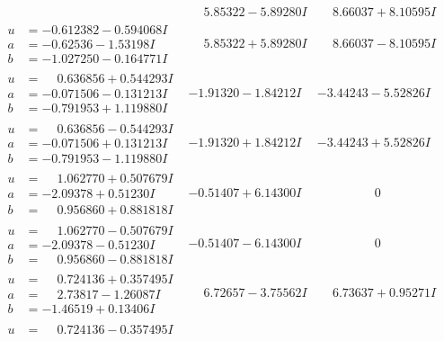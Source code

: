 \documentclass[1p]{elsarticle_modified}
\theoremstyle{definition}
\begin{document}
$$\begin{array}{c|c|c}
 & \phantom{-}5.85322 - 5.89280 I & \phantom{-}8.66037 + 8.10595 I \\ \hline\begin{aligned}
u &= -0.612382 - 0.594068 I \\
a &= -0.62536 - 1.53198 I \\
b &= -1.027250 - 0.164771 I\end{aligned}
 & \phantom{-}5.85322 + 5.89280 I & \phantom{-}8.66037 - 8.10595 I \\ \hline\begin{aligned}
u &= \phantom{-}0.636856 + 0.544293 I \\
a &= -0.071506 - 0.131213 I \\
b &= -0.791953 + 1.119880 I\end{aligned}
 & -1.91320 - 1.84212 I & -3.44243 - 5.52826 I \\ \hline\begin{aligned}
u &= \phantom{-}0.636856 - 0.544293 I \\
a &= -0.071506 + 0.131213 I \\
b &= -0.791953 - 1.119880 I\end{aligned}
 & -1.91320 + 1.84212 I & -3.44243 + 5.52826 I \\ \hline\begin{aligned}
u &= \phantom{-}1.062770 + 0.507679 I \\
a &= -2.09378 + 0.51230 I \\
b &= \phantom{-}0.956860 + 0.881818 I\end{aligned}
 & -0.51407 + 6.14300 I & \phantom{-0.000000 } 0 \\ \hline\begin{aligned}
u &= \phantom{-}1.062770 - 0.507679 I \\
a &= -2.09378 - 0.51230 I \\
b &= \phantom{-}0.956860 - 0.881818 I\end{aligned}
 & -0.51407 - 6.14300 I & \phantom{-0.000000 } 0 \\ \hline\begin{aligned}
u &= \phantom{-}0.724136 + 0.357495 I \\
a &= \phantom{-}2.73817 - 1.26087 I \\
b &= -1.46519 + 0.13406 I\end{aligned}
 & \phantom{-}6.72657 - 3.75562 I & \phantom{-}6.73637 + 0.95271 I \\ \hline\begin{aligned}
u &= \phantom{-}0.724136 - 0.357495 I \\

\end{aligned}
\end{array}$$
\end{document}
